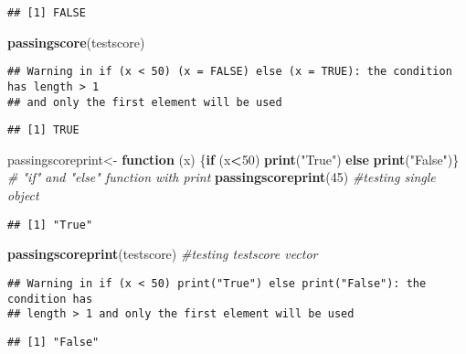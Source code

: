 \documentclass[]{article}
\newenvironment{Shaded}{\begin{snugshade}}{\end{snugshade}}
\newcommand{\CommentTok}[1]{\textcolor[rgb]{0.56,0.35,0.01}{\textit{#1}}}
\newcommand{\ControlFlowTok}[1]{\textcolor[rgb]{0.13,0.29,0.53}{\textbf{#1}}}
\newcommand{\DecValTok}[1]{\textcolor[rgb]{0.00,0.00,0.81}{#1}}
\newcommand{\KeywordTok}[1]{\textcolor[rgb]{0.13,0.29,0.53}{\textbf{#1}}}
\newcommand{\NormalTok}[1]{#1}
\newcommand{\OperatorTok}[1]{\textcolor[rgb]{0.81,0.36,0.00}{\textbf{#1}}}
\newcommand{\StringTok}[1]{\textcolor[rgb]{0.31,0.60,0.02}{#1}}
\begin{document}
\begin{verbatim}
## [1] FALSE
\end{verbatim}

\begin{Shaded}
\begin{Highlighting}[]
\KeywordTok{passingscore}\NormalTok{(testscore)}
\end{Highlighting}
\end{Shaded}

\begin{verbatim}
## Warning in if (x < 50) (x = FALSE) else (x = TRUE): the condition has length > 1
## and only the first element will be used
\end{verbatim}

\begin{verbatim}
## [1] TRUE
\end{verbatim}

\begin{Shaded}
\begin{Highlighting}[]
\NormalTok{passingscoreprint<-}\StringTok{ }\ControlFlowTok{function}\NormalTok{ (x) \{}\ControlFlowTok{if}\NormalTok{ (x}\OperatorTok{<}\DecValTok{50}\NormalTok{) }\KeywordTok{print}\NormalTok{(}\StringTok{"True"}\NormalTok{) }\ControlFlowTok{else} \KeywordTok{print}\NormalTok{(}\StringTok{"False"}\NormalTok{)\} }\CommentTok{# "if" and  "else" function with print }
\KeywordTok{passingscoreprint}\NormalTok{(}\DecValTok{45}\NormalTok{) }\CommentTok{#testing single object }
\end{Highlighting}
\end{Shaded}

\begin{verbatim}
## [1] "True"
\end{verbatim}

\begin{Shaded}
\begin{Highlighting}[]
\KeywordTok{passingscoreprint}\NormalTok{(testscore) }\CommentTok{#testing testscore vector }
\end{Highlighting}
\end{Shaded}

\begin{verbatim}
## Warning in if (x < 50) print("True") else print("False"): the condition has
## length > 1 and only the first element will be used
\end{verbatim}

\begin{verbatim}
## [1] "False"
\end{verbatim}
\end{document}
